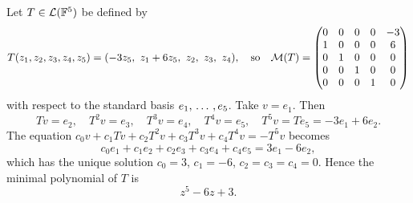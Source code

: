 \setcounter{thm}{24}
\begin{example}
  Let $T \in \mathcal{L}(\mathbb{F}^5)$ be defined by
  \begin{equation}
    T(z_1, z_2, z_3, z_4, z_5) = (-3z_5,\ z_1 + 6z_5,\ z_2,\ z_3,\ z_4),
    \quad \text{so} \quad
    \mathcal{M}(T) =
    \begin{pmatrix}
      0 & 0 & 0 & 0 & -3 \\
      1 & 0 & 0 & 0 & 6 \\
      0 & 1 & 0 & 0 & 0 \\
      0 & 0 & 1 & 0 & 0 \\
      0 & 0 & 0 & 1 & 0
    \end{pmatrix}
  \end{equation}
  with respect to the standard basis $e_1, {\, \ldots \,\,}, e_5$. Take $v = e_1$. Then
  \begin{equation}
    Tv = e_2, \quad T^2v = e_3, \quad T^3v = e_4, \quad T^4v = e_5, \quad T^5v = Te_5 = -3e_1 + 6e_2.
  \end{equation}
  The equation $c_0v + c_1Tv + c_2T^2v + c_3T^3v + c_4T^4v = -T^5v$ becomes
  \begin{equation}
    c_0e_1 + c_1e_2 + c_2e_3 + c_3e_4 + c_4e_5 = 3e_1 - 6e_2,
  \end{equation}
  which has the unique solution $c_0 = 3$, $c_1 = -6$, $c_2 = c_3 = c_4 = 0$. Hence the minimal polynomial of $T$ is
  \begin{equation}
    z^5 - 6z + 3.
  \end{equation}
\end{example}

